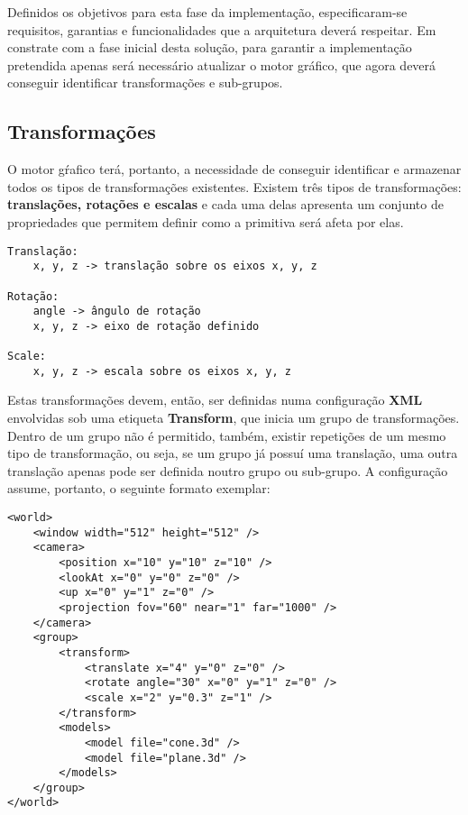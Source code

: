Definidos os objetivos para esta fase da implementação,
especificaram-se requisitos, garantias e funcionalidades
que a arquitetura deverá respeitar.
\newline
\break
\noindent
Em constrate com a fase inicial desta solução, para
garantir a implementação pretendida apenas será
necessário atualizar o motor gráfico, que agora deverá
conseguir identificar transformações e sub-grupos.

\subsection{Transformações}

O motor gŕafico terá, portanto, a necessidade de
conseguir identificar e armazenar todos os tipos
de transformações existentes.
\newline
\break
\noindent
Existem três tipos de transformações:
\textbf{translações, rotações e escalas} e cada uma delas
apresenta um conjunto de propriedades que permitem
definir como a primitiva será afeta por elas.
\newline

\begin{tcolorbox}[
    colback=blue!10!white,
    colframe=black!50!black,
]
\begin{verbatim}
Translação:
    x, y, z -> translação sobre os eixos x, y, z

Rotação:
    angle -> ângulo de rotação
    x, y, z -> eixo de rotação definido

Scale:
    x, y, z -> escala sobre os eixos x, y, z
\end{verbatim}
\end{tcolorbox}

\vspace{12pt}
\noindent
Estas transformações devem, então, ser definidas numa
configuração \textbf{XML} envolvidas sob uma etiqueta
\textbf{Transform}, que inicia um grupo de
transformações.
\newline
\break
\noindent
Dentro de um grupo não é permitido, também,
existir repetições de um mesmo tipo de transformação,
ou seja, se um grupo já possuí uma translação, uma outra
translação apenas pode ser definida noutro grupo ou
sub-grupo.
\newline
\break
\noindent
A configuração assume, portanto, o seguinte
formato exemplar:
\newline

\begin{tcolorbox}[
    colback=blue!10!white,
    colframe=black!50!black,
    after upper={\hfill\textbf{xml}}
]
\begin{verbatim}
<world>
    <window width="512" height="512" />
    <camera>
        <position x="10" y="10" z="10" />
        <lookAt x="0" y="0" z="0" />
        <up x="0" y="1" z="0" />
        <projection fov="60" near="1" far="1000" />
    </camera>
    <group>
        <transform>
            <translate x="4" y="0" z="0" />
            <rotate angle="30" x="0" y="1" z="0" />
            <scale x="2" y="0.3" z="1" />
        </transform>
        <models>
            <model file="cone.3d" />
            <model file="plane.3d" />
        </models>
    </group>
</world>
\end{verbatim}
\end{tcolorbox}